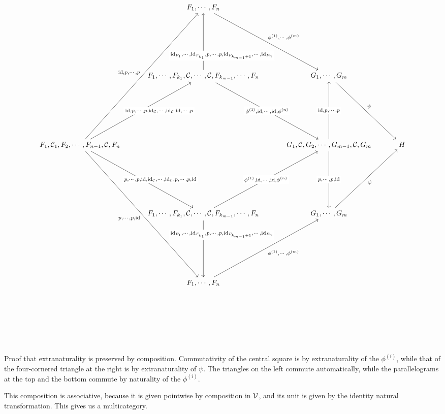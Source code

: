 \documentclass{article}
\begin{document}
\begin{SidewaysFigure}
  \[
    \begin{tikzcd}[ampersand replacement=\&, row sep=80pt, column sep=30pt]
        \& F_1,\cdots,F_n \arrow[dr, "{\phi^{(1)},\cdots,\phi^{(m)}}"]
          \&
            \& \\
        \& F_1,\cdots,F_{k_1},\C,\cdots,\C,F_{k_{m-1}},\cdots,F_n \arrow[u, "{\id_{F_1},\cdots,\id_{F_{k_1}},p,\cdots,p,\id_{F_{k_{m-1}+1}},\cdots,\id_{F_n}}"' {description, near start, xshift=6ex}] \arrow[dr, "{\phi^{(1)},\id,\cdots,\id,\phi^{(n)}}" description]
          \& G_1,\cdots,G_m \arrow[dr, "\psi"]
            \& \\
      F_1,\C_1,F_2,\cdots,F_{n-1},\C,F_n \arrow[uur, "{\id,p,\cdots,p}"] \arrow[ddr, "{p,\cdots,p,\id}"'] \arrow[ur, "{\id,p,\cdots,p,\id_{\C},\cdots,\id_{\C},\id,\cdots,p}"' {description, xshift=6ex}] \arrow[dr, "{p,\cdots,p,\id,\id_{\C},\cdots,\id_{\C},p,\cdots,p,\id}" {description, xshift=6ex}]
        \&
          \& G_1,\C,G_2,\cdots,G_{m-1},\C,G_m \arrow[u, "{\id,p,\cdots,p}" description] \arrow[d, "{p,\cdots,p,\id}" description]
            \& H \\
        \& F_1,\cdots,F_{k_1},\C,\cdots,\C,F_{k_{m-1}},\cdots,F_n \arrow[d, "{\id_{F_1},\cdots,\id_{F_{k_1}},p,\cdots,p,\id_{F_{k_{m-1}+1}},\cdots,\id_{F_n}}"' {description, near start, xshift=6ex}] \arrow[ur, "{\phi^{(1)},\id,\cdots,\id,\phi^{(n)}}" description]
          \& G_1,\cdots,G_m \arrow[ur, "\psi"']
            \& \\
        \& F_1,\cdots,F_n \arrow[ur, "{\phi^{(1)},\cdots,\phi^{(m)}}"']
          \&
            \& \\
    \end{tikzcd}
    \]
  \caption{Proof that extranaturality is preserved by composition.  
  Commutativity of the central square is by extranaturality of the $\phi^{(i)}$, while that of the four-cornered triangle at the right is by extranaturality of $\psi$.  
  The triangles on the left commute automatically, while the parallelograms at the top and the bottom commute by naturality of the $\phi^{(i)}$.}
  \label{FigExtranaturalityComposition}
\end{SidewaysFigure}

This composition is associative, because it is given pointwise by composition in ${\mathcal{V}}$, and its unit is given by the identity natural transformation.  
This gives us a multicategory.  
\end{document}

